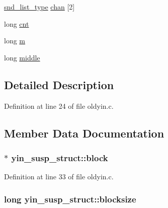 \begin{DoxyCompactItemize}
\item 
\hyperlink{sound_8h_ab05388854adb60c2855a70276d2ceb65}{snd\+\_\+list\+\_\+type} \hyperlink{structyin__susp__struct_a8ed5abf4c9ced2a2de05db880e6c2bcb}{chan} \mbox{[}2\mbox{]}
\item 
long \hyperlink{structyin__susp__struct_a4899b99a1ecf0fdd5a5c8b1aa8d25836}{cnt}
\item 
long \hyperlink{structyin__susp__struct_ad4c2052aa918a157ac89a56b3f44191e}{m}
\item 
long \hyperlink{structyin__susp__struct_a3d35ef2064fcba2280b537ad3124467b}{middle}
\end{DoxyCompactItemize}


\subsection{Detailed Description}


Definition at line 24 of file oldyin.\+c.



\subsection{Member Data Documentation}
\subsubsection[{\texorpdfstring{block}{block}}]{ $\ast$ yin\+\_\+susp\+\_\+struct\+::block}\hypertarget{structyin__susp__struct_a8c97a26cf5ab9530883a11d0d4c2e381}{}\label{structyin__susp__struct_a8c97a26cf5ab9530883a11d0d4c2e381}


Definition at line 33 of file oldyin.\+c.

\subsubsection[{\texorpdfstring{blocksize}{blocksize}}]{\setlength{\rightskip}{0pt plus 5cm}long yin\+\_\+susp\+\_\+struct\+::blocksize}\hypertarget{structyin__susp__struct_a1e8feb96618ed3cab2833b3babfadfc4}{}\label{structyin__susp__struct_a1e8feb96618ed3cab2833b3babfadfc4}


